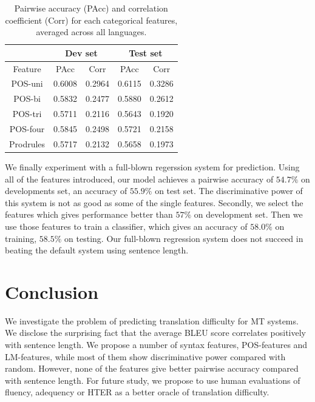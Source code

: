 \documentclass[11pt]{article}
\begin{document}
\begin{table}[ht]
\centering
\begin{small}
\begin{tabular}{c|cc|cc}
& \multicolumn{2}{c|}{Dev set} & \multicolumn{2}{c}{Test set} \\ \hline
Feature & PAcc & Corr & PAcc & Corr \\ \hline \hline
POS-uni & 0.6008 & 0.2964 & 0.6115 & 0.3286 \\
POS-bi & 0.5832 & 0.2477 & 0.5880 & 0.2612 \\
POS-tri & 0.5711 & 0.2116 & 0.5643 & 0.1920 \\
POS-four & 0.5845 & 0.2498 & 0.5721 & 0.2158 \\
Prodrules & 0.5717 & 0.2132 & 0.5658 & 0.1973 \\
\end{tabular}
\end{small}
\caption{Pairwise accuracy (PAcc) and correlation coefficient (Corr) for each categorical features, averaged across all languages.}
\label{tab:indivresults2}
\end{table}

We finally experiment with a full-blown regerssion system for prediction.
Using all of the features introduced, our model achieves a pairwise accuracy  of $54.7\%$ on developments set,  an accuracy of $55.9\%$ on test set.
The discriminative power of this system is not as good as some of the single features.
Secondly, we select the features which gives performance better than $57\%$ on development set. 
Then we use those features to train a classifier, which gives an accuracy of $58.0\%$ on training, $58.5\%$ on testing.
Our full-blown regression system does not succeed in beating the default system using sentence length.

\section{Conclusion}
We investigate the problem of predicting translation difficulty for MT systems.
We disclose the surprising fact that the average  BLEU score correlates positively with sentence length.
We propose a number of syntax features, POS-features and LM-features, while most of them show discriminative power compared with random.
However, none of the features give better pairwise accuracy compared with sentence length.
For future study, we propose to use human evaluations of fluency, adequency or HTER as a better oracle of translation difficulty.



\end{document}
